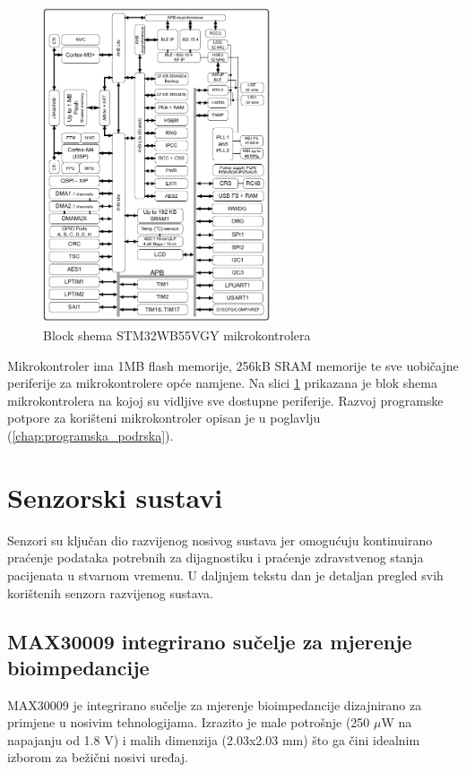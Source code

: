 \documentclass[../diplomski_rad.tex]{subfiles}
\begin{document}
\begin{figure}[htb!]
    \centering
    \includegraphics[width=0.6\textwidth]{Figures/stm32mikro.png} 
    \caption{Block shema STM32WB55VGY mikrokontrolera \cite{stm32mikro}}
    \label{slk:stm32mikro}
\end{figure}

Mikrokontroler ima 1MB flash memorije, 256kB SRAM memorije te sve uobičajne periferije za mikrokontrolere opće namjene. 
Na slici \ref{slk:stm32mikro} prikazana je blok shema mikrokontrolera na kojoj su vidljive sve dostupne periferije.
Razvoj programske potpore za korišteni mikrokontroler opisan je u poglavlju (\ref{chap:programska_podrska}).

\section{Senzorski sustavi}

Senzori su ključan dio razvijenog nosivog sustava jer omogućuju kontinuirano praćenje podataka potrebnih 
za dijagnostiku i praćenje zdravstvenog stanja pacijenata u stvarnom vremenu.
U daljnjem tekstu dan je detaljan pregled svih korištenih senzora razvijenog sustava.

\subsection{MAX30009 integrirano sučelje za mjerenje bioimpedancije}

MAX30009 je integrirano sučelje za mjerenje bioimpedancije dizajnirano za primjene u nosivim tehnologijama. 
Izrazito je male potrošnje (250 $\mu$W na napajanju od 1.8 V) \cite{max30009} i malih dimenzija (2.03x2.03 mm) što ga čini idealnim izborom za bežični nosivi uređaj.  
\end{document}
